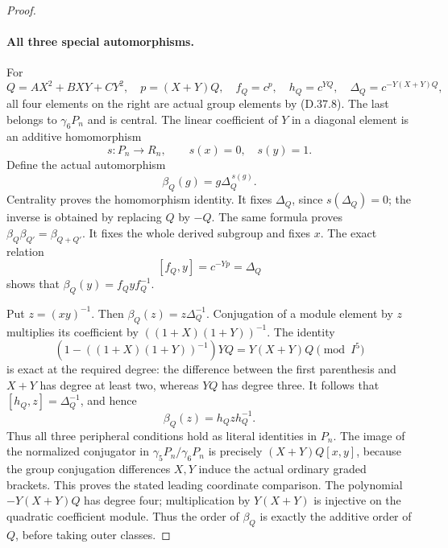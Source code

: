\begin{proof}
\paragraph{All three special automorphisms.}
For
\[
 Q=AX^2+BXY+CY^2,\quad
 p=(X+Y)Q,\quad
 f_Q=c^p,\quad h_Q=c^{YQ},\quad
 \Delta_Q=c^{-Y(X+Y)Q},
 \tag{D.37.14}
\]
all four elements on the right are actual group
elements by \textup{(D.37.8)}.
The last belongs to \(\gamma_6P_n\) and is central.
The linear coefficient of \(Y\) in a diagonal
element is an additive homomorphism
\[
 s:P_n\longrightarrow R_n,\qquad s(x)=0,\quad s(y)=1.
 \tag{D.37.15}
\]
Define the actual automorphism
\[
                         \beta_Q(g)=g\Delta_Q^{\,s(g)}.
 \tag{D.37.16}
\]
Centrality proves the homomorphism identity.
It fixes \(\Delta_Q\), since \(s(\Delta_Q)=0\);
the inverse is obtained by replacing \(Q\) by \(-Q\).
The same formula proves
\(\beta_Q\beta_{Q'}=\beta_{Q+Q'}\).
It fixes the whole derived subgroup and fixes \(x\).
The exact relation
\[
           [f_Q,y]=c^{-Yp}=\Delta_Q
 \tag{D.37.17}
\]
shows that \(\beta_Q(y)=f_Qyf_Q^{-1}\).

Put \(z=(xy)^{-1}\).  Then
\(\beta_Q(z)=z\Delta_Q^{-1}\).
Conjugation of a module element by \(z\) multiplies
its coefficient by \(((1+X)(1+Y))^{-1}\).
The identity
\[
 \left(1-((1+X)(1+Y))^{-1}\right)YQ
                =Y(X+Y)Q\pmod{I^5}
 \tag{D.37.18}
\]
is exact at the required degree: the difference
between the first parenthesis and \(X+Y\) has
degree at least two, whereas \(YQ\) has degree three.
It follows that
\([h_Q,z]=\Delta_Q^{-1}\), and hence
\[
                         \beta_Q(z)=h_Qzh_Q^{-1}.
 \tag{D.37.19}
\]
Thus all three peripheral conditions hold as
literal identities in \(P_n\).
The image of the normalized conjugator in
\(\gamma_5P_n/\gamma_6P_n\) is precisely
\((X+Y)Q[x,y]\), because the group conjugation
differences \(X,Y\) induce the actual ordinary
graded brackets.  This proves the stated leading
coordinate comparison.
The polynomial \(-Y(X+Y)Q\) has degree four;
multiplication by \(Y(X+Y)\) is injective on
the quadratic coefficient module.  Thus
the order of \(\beta_Q\) is exactly the additive
order of \(Q\), before taking outer classes.


\end{proof}
